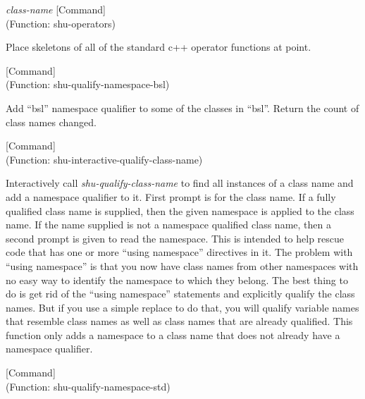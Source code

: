 \vspace{1em}
\noindent
{}
\usebox{\funcname}\emph{class-name}
 \hfill [Command]\\%
 (Function: shu-operators)

\begin{doc-string}
Place skeletons of all of the standard c++ operator functions at point.
\end{doc-string}

\vspace{1em}
\noindent
{}
\usebox{\funcname}
 \hfill [Command]\\%
 (Function: shu-qualify-namespace-bsl)

\begin{doc-string}
Add ``bsl'' namespace qualifier to some of the classes in ``bsl''.  Return the
count of class names changed.
\end{doc-string}

\vspace{1em}
\noindent
{}
\usebox{\funcname}
 \hfill [Command]\\%
 (Function: shu-interactive-qualify-class-name)

\begin{doc-string}
Interactively call \emph{shu-qualify-class-name} to find all instances of a class name and
add a namespace qualifier to it.  First prompt is for the class name.  If a fully qualified
class name is supplied, then the given namespace is applied to the class name.  If the name
supplied is not a namespace qualified class name, then a second prompt is given to read the
namespace.
This is intended to help rescue code that has one or more ``using namespace''
directives in it.  The problem with ``using namespace'' is that you now have
class names from other namespaces with no easy way to identify the namespace
to which they belong.  The best thing to do is get rid of the ``using
namespace'' statements and explicitly qualify the class names.  But if you
use a simple replace to do that, you will qualify variable names that resemble
class names as well as class names that are already qualified.  This function
only adds a namespace to a class name that does not already have a namespace
qualifier.
\end{doc-string}

\vspace{1em}
\noindent
{}
\usebox{\funcname}
 \hfill [Command]\\%
 (Function: shu-qualify-namespace-std)

